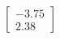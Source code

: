 \documentclass[preview]{standalone}
\begin{document}
\begin{align*}
\begin{bmatrix} -3.75 \\ 2.38 \end{bmatrix}
\end{align*}
\end{document}
